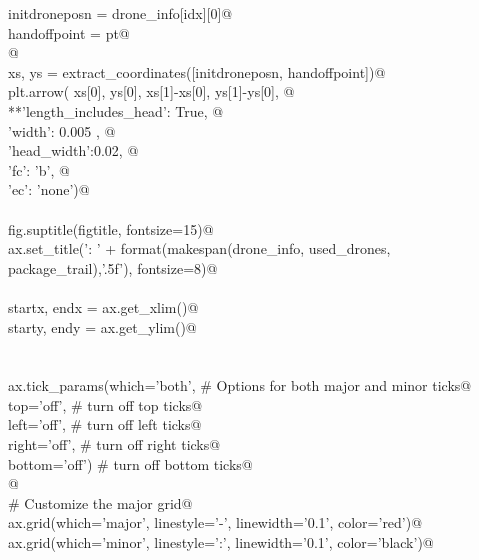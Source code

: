 \documentclass[12pt, english, oneside]{report}
\begin{document}
\begin{appendices}
\begin{flushleft}
\begin{list}{}{}
\mbox{}\verb@         initdroneposn = drone_info[idx][0]@\\
\mbox{}\verb@         handoffpoint  = pt@\\
\mbox{}\verb@    @\\
\mbox{}\verb@         xs, ys = extract_coordinates([initdroneposn, handoffpoint])@\\
\mbox{}\verb@         plt.arrow( xs[0], ys[0], xs[1]-xs[0], ys[1]-ys[0], @\\
\mbox{}\verb@                    **{'length_includes_head': True, @\\
\mbox{}\verb@                       'width': 0.005 , @\\
\mbox{}\verb@                       'head_width':0.02, @\\
\mbox{}\verb@                       'fc': 'b', @\\
\mbox{}\verb@                       'ec': 'none'})@\\
\mbox{}\verb@@\\
\mbox{}\verb@    fig.suptitle(figtitle, fontsize=15)@\\
\mbox{}\verb@    ax.set_title('\nMakespan: ' + format(makespan(drone_info, used_drones, package_trail),'.5f'), fontsize=8)@\\
\mbox{}\verb@@\\
\mbox{}\verb@    startx, endx = ax.get_xlim()@\\
\mbox{}\verb@    starty, endy = ax.get_ylim()@\\
\mbox{}\verb@@\\
\mbox{}\verb@@\\
\mbox{}\verb@    ax.tick_params(which='both', # Options for both major and minor ticks@\\
\mbox{}\verb@                top='off', # turn off top ticks@\\
\mbox{}\verb@                left='off', # turn off left ticks@\\
\mbox{}\verb@                right='off',  # turn off right ticks@\\
\mbox{}\verb@                bottom='off') # turn off bottom ticks@\\
\mbox{}\verb@    @\\
\mbox{}\verb@    # Customize the major grid@\\
\mbox{}\verb@    ax.grid(which='major', linestyle='-', linewidth='0.1', color='red')@\\
\mbox{}\verb@    ax.grid(which='minor', linestyle=':', linewidth='0.1', color='black')@\\

\end{list}
\end{flushleft}
\end{appendices}
\end{document}

